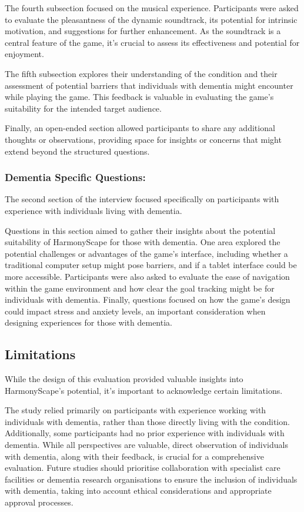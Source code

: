 \documentclass{l4proj}
\begin{document}
The fourth subsection focused on the musical experience. Participants were asked to evaluate the pleasantness of the dynamic soundtrack, its potential for intrinsic motivation, and suggestions for further enhancement. As the soundtrack is a central feature of the game, it's crucial to assess its effectiveness and potential  for enjoyment.  

The fifth subsection explores their understanding of the condition and their assessment of potential barriers that individuals with dementia might encounter while playing the game. This feedback is valuable in evaluating the game's suitability for the intended target audience.  

Finally, an open-ended section allowed participants to share any additional thoughts or observations, providing space for insights or concerns that might extend beyond the structured questions.

\subsubsection{Dementia Specific Questions:}
The second section of the interview focused specifically on participants with experience with individuals living with dementia. 

Questions in this section aimed to gather their insights about the potential suitability of HarmonyScape for those with dementia. One area explored the potential challenges or advantages of the game's interface, including whether a traditional computer setup might pose barriers, and if a tablet interface could be more accessible. Participants were also asked to evaluate the ease of navigation within the game environment and how clear the goal tracking might be for individuals with dementia.  Finally, questions focused on how the game's design could impact stress and anxiety levels, an important consideration when designing experiences for those with dementia.

\subsection{Limitations}
While the design of this evaluation provided valuable insights into HarmonyScape's potential, it's important to acknowledge certain limitations. 

The study relied primarily on participants with experience working with individuals with dementia, rather than those directly living with the condition. Additionally, some participants had no prior experience with individuals with dementia. While all perspectives are valuable, direct observation of individuals with dementia, along with their feedback, is crucial for a comprehensive evaluation. Future studies should prioritise collaboration with specialist care facilities or dementia research organisations to ensure the inclusion of individuals with dementia, taking into account ethical considerations and appropriate approval processes.
\end{document}
